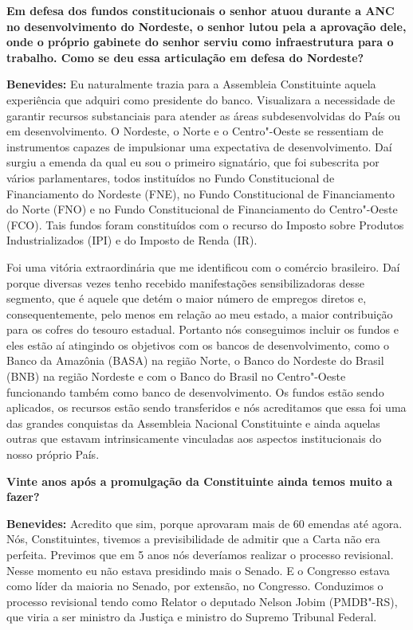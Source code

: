 \textbf{Em defesa dos fundos constitucionais o senhor atuou durante a
ANC no desenvolvimento do Nordeste, o senhor lutou pela a aprovação
dele, onde o próprio gabinete do senhor serviu como infraestrutura para
o trabalho. Como se deu essa articulação em defesa do Nordeste?}

\textbf{Benevides:} Eu naturalmente trazia para a Assembleia
Constituinte aquela experiência que adquiri como presidente do banco.
Visualizara a necessidade de garantir recursos substanciais para atender
as áreas subdesenvolvidas do País ou em desenvolvimento. O Nordeste, o
Norte e o Centro"-Oeste se ressentiam de instrumentos capazes de
impulsionar uma expectativa de desenvolvimento. Daí surgiu a emenda da
qual eu sou o primeiro signatário, que foi subescrita por vários
parlamentares, todos instituídos no Fundo Constitucional de
Financiamento do Nordeste (FNE), no Fundo Constitucional de
Financiamento do Norte (FNO) e no Fundo Constitucional de Financiamento
do Centro"-Oeste (FCO). Tais fundos foram constituídos com o recurso do
Imposto sobre Produtos Industrializados (IPI) e do Imposto de Renda
(IR).

Foi uma vitória extraordinária que me identificou com o comércio
brasileiro. Daí porque diversas vezes tenho recebido manifestações
sensibilizadoras desse segmento, que é aquele que detém o maior número
de empregos diretos e, consequentemente, pelo menos em relação ao meu
estado, a maior contribuição para os cofres do tesouro estadual.
Portanto nós conseguimos incluir os fundos e eles estão aí atingindo os
objetivos com os bancos de desenvolvimento, como o Banco da Amazônia
(BASA) na região Norte, o Banco do Nordeste do Brasil (BNB) na região
Nordeste e com o Banco do Brasil no Centro"-Oeste funcionando também como
banco de desenvolvimento. Os fundos estão sendo aplicados, os recursos
estão sendo transferidos e nós acreditamos que essa foi uma das grandes
conquistas da Assembleia Nacional Constituinte e ainda aquelas outras
que estavam intrinsicamente vinculadas aos aspectos institucionais do
nosso próprio País.

\textbf{Vinte anos após a promulgação da Constituinte ainda temos muito
a fazer?}

\textbf{Benevides:} Acredito que sim, porque aprovaram mais de 60
emendas até agora. Nós, Constituintes, tivemos a previsibilidade de
admitir que a Carta não era perfeita. Previmos que em 5 anos nós
deveríamos realizar o processo revisional. Nesse momento eu não estava
presidindo mais o Senado. E o Congresso estava como líder da maioria no
Senado, por extensão, no Congresso. Conduzimos o processo revisional
tendo como Relator o deputado Nelson Jobim (PMDB"-RS), que viria a ser
ministro da Justiça e ministro do Supremo Tribunal Federal.

